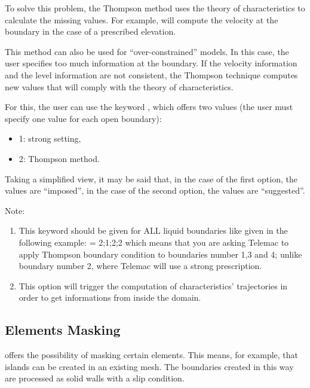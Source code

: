  To solve this problem, the Thompson method uses the theory of characteristics to calculate the missing values. For example,  will compute the velocity at the boundary in the case of a prescribed elevation.

 This method can also be used for ``over-constrained'' models. In this case, the user specifies too much information at the boundary. If the velocity information and the level information are not consistent, the Thompson technique computes new values that will comply with the theory of characteristics.

 For this, the user can use the keyword , which offers two values (the user must specify one value for each open boundary):

\begin{itemize}
\item [\nonumber] 1: strong setting,

\item [\nonumber] 2: Thompson method.
\end{itemize}

 Taking a simplified view, it may be said that, in the case of the first option, the values are ``imposed'', in the case of the second option, the values are ``suggested''.

\begin{WarningBlock}{Note:}
\begin{enumerate}
\item This keyword should be given for ALL liquid boundaries like given in the following example: \newline
    = 2;1;2;2 \newline
which means that you are asking Telemac to apply Thompson boundary condition to boundaries number 1,3 and 4; unlike boundary number 2, where Telemac will use a strong prescription.
\item This option will trigger the computation of characteristics' trajectories in order to get informations from inside the domain.
\end{enumerate}
\end{WarningBlock}

\subsection{ Elements Masking}

  offers the possibility of masking certain elements. This means, for example, that islands can be created in an existing mesh. The boundaries created in this way are processed as solid walls with a slip condition.

